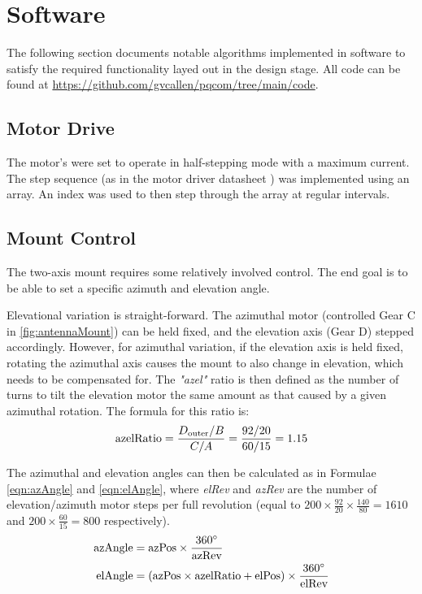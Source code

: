 \section{Software}

The following section documents notable algorithms implemented in software to satisfy the required functionality layed out in the design stage. All code can be found at \url{https://github.com/gvcallen/pqcom/tree/main/code}.

\subsection{Motor Drive}
The motor's were set to operate in half-stepping mode with a maximum current. The step sequence (as in the motor driver datasheet \cite{datasheet-L6219}) was implemented using an array. An index was used to then step through the array at regular intervals.

\subsection{Mount Control}
The two-axis mount requires some relatively involved control. The end goal is to be able to set a specific azimuth and elevation angle.

Elevational variation is straight-forward. The azimuthal motor (controlled Gear C in \ref{fig:antennaMount}) can be held fixed, and the elevation axis (Gear D) stepped accordingly. However, for azimuthal variation, if the elevation axis is held fixed, rotating the azimuthal axis causes the mount to also change in elevation, which needs to be compensated for. The \textit{"azel"} ratio is then defined as the number of turns to tilt the elevation motor the same amount as that caused by a given azimuthal rotation. The formula for this ratio is:
\begin{equation}\label{eqn:azelRatio}
\textnormal{azelRatio} = \frac{D_{\textnormal{outer}} / B}{C / A} = \frac{92 / 20}{60 / 15} = 1.15
\end{equation}

\noindent The azimuthal and elevation angles can then be calculated as in Formulae \ref{eqn:azAngle} and \ref{eqn:elAngle}, where \textit{elRev} and \textit{azRev} are the number of elevation/azimuth motor steps per full revolution (equal to $200 \times \frac{92}{20} \times \frac{140}{80} = 1610$ and $200 \times \frac{60}{15} = 800$ respectively).
\begin{align}
    \textnormal{azAngle} &= \textnormal{azPos} \times \frac{360 ^{\circ}}{\textnormal{azRev}} \label{eqn:azAngle} \\
    \textnormal{elAngle} &= (\textnormal{azPos} \times \textnormal{azelRatio} + \textnormal{elPos}) \times \frac{360 ^{\circ}}{\textnormal{elRev}} \label{eqn:elAngle}
\end{align}


